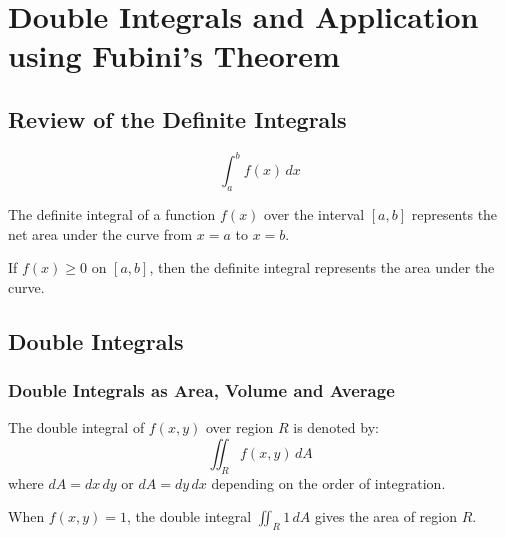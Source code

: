 \chapter{Double Integrals and Application using Fubini's Theorem}
\label{chap:double-integrals-and-application-using-fubini-s-theorem}

\section{Review of the Definite Integrals}
\label{sec:review-of-the-definite-integrals}

\begin{equation}\label{eq:definite-integral}
  \int_{a}^{b}f(x)\,dx  
\end{equation}

\begin{definition}
  \label{def:definite-integral}
  The definite integral of a function \(f(x)\) over the interval \([a,b]\) represents the net area under the curve from \(x = a\) to \(x = b\).
\end{definition}

\begin{remark}
  If \(f(x) \geq 0\) on \([a,b]\), then the definite integral represents the area under the curve.
\end{remark}

\section{Double Integrals}
\label{sec:double-integrals}

\subsection{Double Integrals as Area, Volume and Average}
\label{ssec:double-integrals-as-area-volume-and-average}

\begin{definition}
  \label{def:double-integral}
  The double integral of \(f(x,y)\) over region \(R\) is denoted by:
  \begin{equation}\label{eq:double-integral}
    \iint_{R} f(x,y)\,dA
  \end{equation}
  where \(dA = dx\,dy\) or \(dA = dy\,dx\) depending on the order of integration.
\end{definition}

\begin{remark}
  When \(f(x,y) = 1\), the double integral \(\iint_R 1\,dA\) gives the area of region \(R\).
\end{remark}

